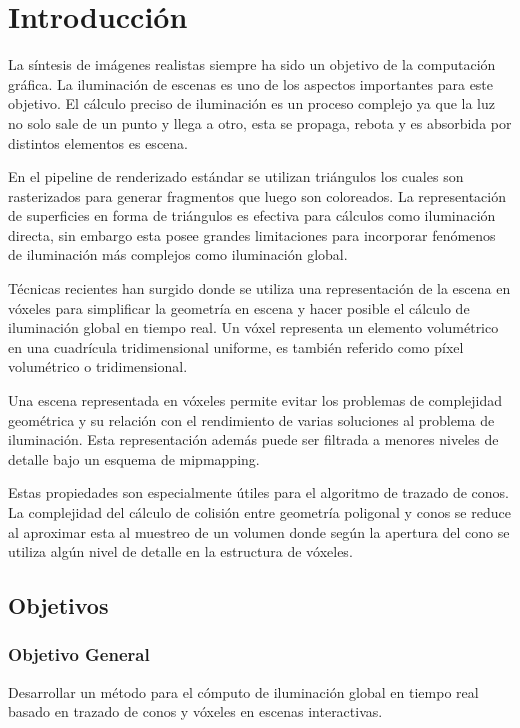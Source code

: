 \chapter*{Introducción}
\label{ch:intro}
La síntesis de imágenes realistas siempre ha sido un objetivo de la computación gráfica. La iluminación de escenas es uno de los aspectos importantes para este objetivo. El cálculo preciso de iluminación es un proceso complejo ya que la luz no solo sale de un punto y llega a otro, esta se propaga, rebota y es absorbida por distintos elementos es escena.

En el pipeline de renderizado estándar se utilizan triángulos los cuales son rasterizados para generar fragmentos que luego son coloreados. La representación de superficies en forma de triángulos es efectiva para cálculos como iluminación directa, sin embargo esta posee grandes limitaciones para incorporar fenómenos de iluminación más complejos como iluminación global.

Técnicas recientes han surgido donde se utiliza una representación de la escena en vóxeles para simplificar la geometría en escena y hacer posible el cálculo de iluminación global en tiempo real. Un vóxel representa un elemento volumétrico en una cuadrícula tridimensional uniforme, es también referido como píxel volumétrico o tridimensional.

Una escena representada en vóxeles permite evitar los problemas de complejidad geométrica y su relación con el rendimiento de varias soluciones al problema de iluminación. Esta representación además puede ser filtrada a menores niveles de detalle bajo un esquema de mipmapping. 

Estas propiedades son especialmente útiles para el algoritmo de trazado de conos. La complejidad del cálculo de colisión entre geometría poligonal y conos se reduce al aproximar esta al muestreo de un volumen donde según la apertura del cono se utiliza algún nivel de detalle en la estructura de vóxeles.

\section*{Objetivos} %
\label{sec:section_name}
\subsection*{Objetivo General} %
\label{sub:subsection_name}
Desarrollar un método para el cómputo de iluminación global en tiempo real basado en trazado de conos y vóxeles en escenas interactivas.
